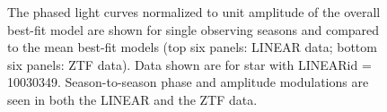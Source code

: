 \begin{figure}[ht]
    \centering
    \caption{The phased light curves normalized to unit amplitude of
      the overall best-fit model are shown for single observing seasons
      and compared to the mean best-fit models (top six panels: LINEAR data; bottom six panels: ZTF data).
      Data shown are for star with LINEARid = 10030349.
      Season-to-season phase and amplitude modulations are seen in both the LINEAR and the ZTF data.}
      \label{fig:phase4}
\end{figure}


